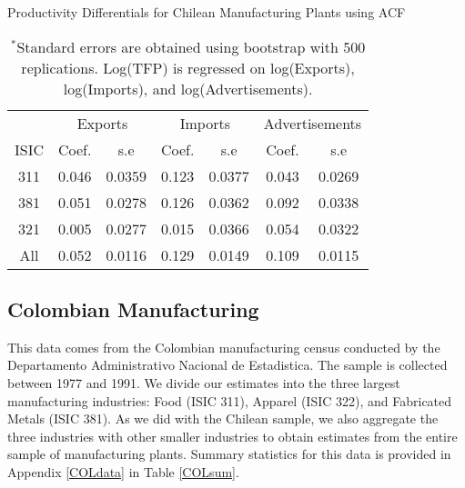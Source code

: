 \documentclass[12pt]{article}
\begin{document}
\begin{table}[H]
\centering
\caption{Productivity Differentials for Chilean Manufacturing Plants using ACF}
\small
\begin{tabular}{ccccccc}
  \hline\hline & \multicolumn{2}{c}{Exports}  & \multicolumn{2}{c}{Imports} & \multicolumn{2}{c}{Advertisements} \\ \cmidrule(lr){2-3} \cmidrule(lr){4-5} \cmidrule(lr){6-7}ISIC & Coef. & s.e & Coef. & s.e & Coef. & s.e \\ 
  \hline
311 & 0.046 & 0.0359 & 0.123 & 0.0377 & 0.043 & 0.0269 \\ 
  381 & 0.051 & 0.0278 & 0.126 & 0.0362 & 0.092 & 0.0338 \\ 
  321 & 0.005 & 0.0277 & 0.015 & 0.0366 & 0.054 & 0.0322 \\ 
  All & 0.052 & 0.0116 & 0.129 & 0.0149 & 0.109 & 0.0115 \\ 
   \hline
\end{tabular}
\caption*{\footnotesize $^{*}$Standard errors are obtained using bootstrap with 500 replications. Log(TFP) is regressed on log(Exports), log(Imports), and log(Advertisements).}
\label{ACFCHLTFPP}
\end{table}


\subsection{Colombian Manufacturing}
This data comes from the Colombian manufacturing census conducted by the Departamento Administrativo Nacional de Estadistica. The sample is collected between 1977 and 1991. We divide our estimates into the three largest manufacturing industries: Food (ISIC 311), Apparel (ISIC 322), and Fabricated Metals (ISIC 381). As we did with the Chilean sample, we also aggregate the three industries with other smaller industries to obtain estimates from the entire sample of manufacturing plants. Summary statistics for this data is provided in Appendix \ref{COLdata} in Table \ref{COLsum}.
\end{document}
